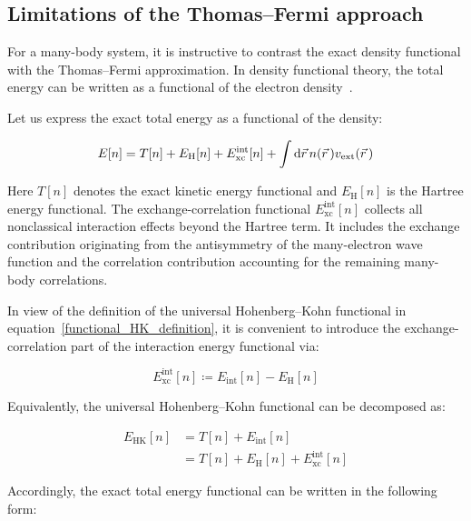 \subsection{Limitations of the Thomas--Fermi approach}

For a many-body system,
it is instructive to contrast the exact density functional with the Thomas--Fermi approximation.
In density functional theory, the total energy can be written as a functional of the electron density~\cite{hohenberg1964inhomogeneous,jones2015density}.

Let us express the exact total energy as a functional of the density:

\begin{equation}
    E[n]=T[n]+E_\mathrm{H}[n]+E_\mathrm{xc}^\mathrm{int}[n]+\int\mathrm{d}{\vec{r}}\,n(\vec{r}\,)v_\mathrm{ext}(\vec{r}\,)
\label{functional_exact_total_energy}
\end{equation}

Here $T[n]$ denotes the exact kinetic energy functional and $E_\mathrm{H}[n]$ is the Hartree energy functional.
The exchange-correlation functional $E_\mathrm{xc}^\mathrm{int}[n]$ collects all nonclassical interaction effects beyond the Hartree term.
It includes the exchange contribution originating from the antisymmetry of the many-electron wave function and the correlation contribution accounting for the remaining many-body correlations.

In view of the definition of the universal Hohenberg--Kohn functional in equation~\eqref{functional_HK_definition},
it is convenient to introduce the exchange-correlation part of the interaction energy functional via:

\begin{equation}
E_\mathrm{xc}^{\mathrm{int}}[n]\coloneqq E_\mathrm{int}[n]-E_\mathrm{H}[n]
\label{Exc_int_definition}
\end{equation}

Equivalently, the universal Hohenberg--Kohn functional can be decomposed as:

\begin{equation}
\begin{aligned}
    E_\mathrm{HK}[n] &= T[n] + E_\mathrm{int}[n] \\
    &= T[n]+E_\mathrm{H}[n]+E_\mathrm{xc}^\mathrm{int}[n]
\end{aligned}
\label{HK_decomposition_Hartree_xc}
\end{equation}

Accordingly, the exact total energy functional can be written in the following form:

